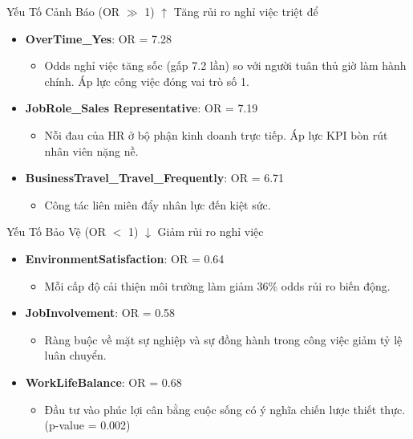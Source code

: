 \begin{frame}{Yếu Tố Cảnh Báo (OR $\gg$ 1)}
  \textcolor{mainred}{$\uparrow$ Tăng rủi ro nghỉ việc triệt để}
  
  \vspace{0.4cm}
  \begin{itemize}
    \item \textbf{OverTime\_Yes}: OR = 7.28
    \begin{itemize}
      \item Odds nghỉ việc tăng sốc (gấp 7.2 lần) so với người tuân thủ giờ làm hành chính. Áp lực công việc đóng vai trò số 1.
    \end{itemize}
    
    \vspace{0.2cm}
    \item \textbf{JobRole\_Sales Representative}: OR = 7.19
    \begin{itemize}
      \item Nỗi đau của HR ở bộ phận kinh doanh trực tiếp. Áp lực KPI bòn rút nhân viên nặng nề.
    \end{itemize}
    
    \vspace{0.2cm}
    \item \textbf{BusinessTravel\_Travel\_Frequently}: OR = 6.71
    \begin{itemize}
      \item Công tác liên miên đẩy nhân lực đến kiệt sức.
    \end{itemize}
  \end{itemize}
\end{frame}

\begin{frame}{Yếu Tố Bảo Vệ (OR $<$ 1)}
  \textcolor{maingreen}{$\downarrow$ Giảm rủi ro nghỉ việc}
  
  \vspace{0.4cm}
  \begin{itemize}
    \item \textbf{EnvironmentSatisfaction}: OR = 0.64
    \begin{itemize}
      \item Mỗi cấp độ cải thiện môi trường làm giảm 36\% odds rủi ro biến động.
    \end{itemize}
    
    \vspace{0.2cm}
    \item \textbf{JobInvolvement}: OR = 0.58
    \begin{itemize}
      \item Ràng buộc về mặt sự nghiệp và sự đồng hành trong công việc giảm tỷ lệ luân chuyển.
    \end{itemize}
    
    \vspace{0.2cm}
    \item \textbf{WorkLifeBalance}: OR = 0.68
    \begin{itemize}
      \item Đầu tư vào phúc lợi cân bằng cuộc sống có ý nghĩa chiến lược thiết thực. (p-value = 0.002)
    \end{itemize}
  \end{itemize}
\end{frame}
